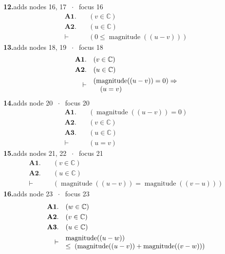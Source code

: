 \documentclass[11pt]{article}
\theoremstyle{plain}
\newcommand{\fit}[1]{\resizebox{\ifdim\width>\linewidth\linewidth\else\width\fi}{!}{#1}}
\begin{document}
\medskip\noindent\textbf{12.}\quad \fit{\texttt{(di)}}\hfill{\small adds nodes 16, 17 $\;\cdot\;$ focus 16}\\[2pt]
\begin{align*}
  \mathbf{A1.}\quad & (v \in \mathbb{C}) \\
  \mathbf{A2.}\quad & (u \in \mathbb{C}) \\
  \vdash\quad & (0 \leq \operatorname{magnitude}((u - v)))
\end{align*}
\medskip\noindent\textbf{13.}\quad \fit{\texttt{(di)}}\hfill{\small adds nodes 18, 19 $\;\cdot\;$ focus 18}\\[2pt]
\begin{align*}
  \mathbf{A1.}\quad & (v \in \mathbb{C}) \\
  \mathbf{A2.}\quad & (u \in \mathbb{C}) \\
  \vdash\quad & \begin{array}{@{}l@{}} (\operatorname{magnitude}((u - v)) = 0) \Rightarrow  \\ \quad (u = v) \end{array}
\end{align*}
\medskip\noindent\textbf{14.}\quad \fit{\texttt{(di)}}\hfill{\small adds node 20 $\;\cdot\;$ focus 20}\\[2pt]
\begin{align*}
  \mathbf{A1.}\quad & (\operatorname{magnitude}((u - v)) = 0) \\
  \mathbf{A2.}\quad & (v \in \mathbb{C}) \\
  \mathbf{A3.}\quad & (u \in \mathbb{C}) \\
  \vdash\quad & (u = v)
\end{align*}
\medskip\noindent\textbf{15.}\quad \fit{\texttt{(di)}}\hfill{\small adds nodes 21, 22 $\;\cdot\;$ focus 21}\\[2pt]
\begin{align*}
  \mathbf{A1.}\quad & (v \in \mathbb{C}) \\
  \mathbf{A2.}\quad & (u \in \mathbb{C}) \\
  \vdash\quad & (\operatorname{magnitude}((u - v)) = \operatorname{magnitude}((v - u)))
\end{align*}
\medskip\noindent\textbf{16.}\quad \fit{\texttt{(di)}}\hfill{\small adds node 23 $\;\cdot\;$ focus 23}\\[2pt]
\begin{align*}
  \mathbf{A1.}\quad & (w \in \mathbb{C}) \\
  \mathbf{A2.}\quad & (v \in \mathbb{C}) \\
  \mathbf{A3.}\quad & (u \in \mathbb{C}) \\
  \vdash\quad & \begin{array}{@{}l@{}} \operatorname{magnitude}((u - w)) \\ \leq\; (\operatorname{magnitude}((u - v)) + \operatorname{magnitude}((v - w))) \end{array}
\end{align*}
\end{document}
